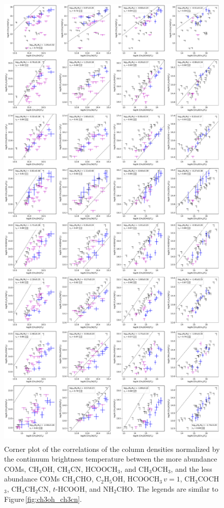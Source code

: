 \documentclass[twocolumn]{aastex62}
\newcommand{\methylformate}{\mbox{HCOOCH$_{3}$}}
\newcommand{\methylformatev}{\mbox{HCOOCH$_{3}$\,$v=1$}}
\newcommand{\methanol}{\mbox{CH$_{3}$OH}}
\newcommand{\dimethylether}{\mbox{CH$_{3}$OCH$_{3}$}}
\newcommand{\acetone}{\mbox{CH$_{3}$COCH$_{3}$}}
\newcommand{\ethanol}{\mbox{C$_{2}$H$_{5}$OH}}
\newcommand{\acetaldehyde}{\mbox{CH$_{3}$CHO}}
\newcommand{\ethylcyanide}{\mbox{CH$_{3}$CH$_{2}$CN}}
\newcommand{\methylcyanide}{\mbox{CH$_{3}$CN}}
\newcommand{\formamide}{\mbox{NH$_{2}$CHO}}
\begin{document}
\begin{figure}[htbp!]
  \centering
  \includegraphics[height=9in]{Ncol_major_minor.pdf}
  \caption{Corner plot of the correlations of the column densities normalized by the continuum brightness temperature between the more abundance COMs, \methanol, \methylcyanide, \methylformate, and \dimethylether, and the less abundance COMs \acetaldehyde, \ethanol, \methylformatev, \acetone, \ethylcyanide, $t$-HCOOH, and \formamide.  The legends are similar to Figure\,\ref{fig:ch3oh_ch3cn}.}
  \label{fig:major_minor}
\end{figure}
\end{document}
